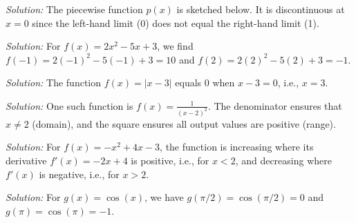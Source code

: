 \documentclass[a4paper,12pt]{book}
\newenvironment{solution}[1][]
{\par\noindent\textit{Solution:} \rmfamily}{\medskip}
\begin{document}
\begin{solution}[5]
The piecewise function \( p(x) \) is sketched below. It is discontinuous at \( x = 0 \) since the left-hand limit (0) does not equal the right-hand limit (1).

\end{solution}

\begin{solution}[6]
For \( f(x) = 2x^2 - 5x + 3 \), we find \( f(-1) = 2(-1)^2 - 5(-1) + 3 = 10 \) and \( f(2) = 2(2)^2 - 5(2) + 3 = -1 \).
\end{solution}

\begin{solution}[7]
The function \( f(x) = |x - 3| \) equals 0 when \( x - 3 = 0 \), i.e., \( x = 3 \).
\end{solution}

\begin{solution}[8]
One such function is \( f(x) = \frac{1}{(x-2)^2} \). The denominator ensures that \( x \neq 2 \) (domain), and the square ensures all output values are positive (range).
\end{solution}

\begin{solution}[9]
For \( f(x) = -x^2 + 4x - 3 \), the function is increasing where its derivative \( f'(x) = -2x + 4 \) is positive, i.e., for \( x < 2 \), and decreasing where \( f'(x) \) is negative, i.e., for \( x > 2 \).
\end{solution}

\begin{solution}[10]
For \( g(x) = \cos(x) \), we have \( g(\pi/2) = \cos(\pi/2) = 0 \) and \( g(\pi) = \cos(\pi) = -1 \).
\end{solution}
\end{document}
